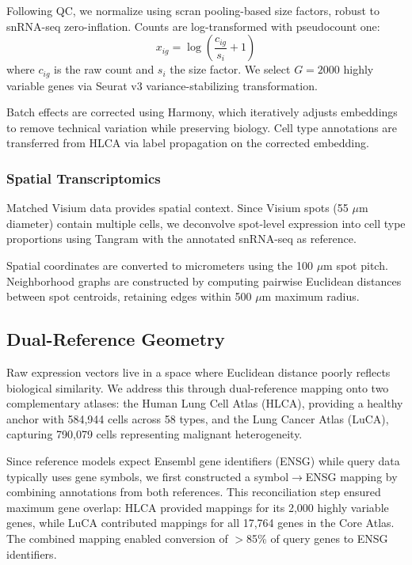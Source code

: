 Following QC, we normalize using scran pooling-based size factors, robust to snRNA-seq zero-inflation. Counts are log-transformed with pseudocount one:
\begin{equation}
    x_{ig} = \log\left(\frac{c_{ig}}{s_i} + 1\right)
\end{equation}
where $c_{ig}$ is the raw count and $s_i$ the size factor. We select $G = 2000$ highly variable genes via Seurat v3 variance-stabilizing transformation.

Batch effects are corrected using Harmony, which iteratively adjusts embeddings to remove technical variation while preserving biology. Cell type annotations are transferred from HLCA via label propagation on the corrected embedding.

\subsubsection{Spatial Transcriptomics}

Matched Visium data provides spatial context. Since Visium spots (55 $\mu$m diameter) contain multiple cells, we deconvolve spot-level expression into cell type proportions using Tangram with the annotated snRNA-seq as reference.

Spatial coordinates are converted to micrometers using the 100 $\mu$m spot pitch. Neighborhood graphs are constructed by computing pairwise Euclidean distances between spot centroids, retaining edges within 500 $\mu$m maximum radius.

\subsection{Dual-Reference Geometry}

Raw expression vectors live in a space where Euclidean distance poorly reflects biological similarity. We address this through dual-reference mapping onto two complementary atlases: the Human Lung Cell Atlas (HLCA), providing a healthy anchor with 584,944 cells across 58 types, and the Lung Cancer Atlas (LuCA), capturing 790,079 cells representing malignant heterogeneity.

Since reference models expect Ensembl gene identifiers (ENSG) while query data typically uses gene symbols, we first constructed a symbol$\to$ENSG mapping by combining annotations from both references. This reconciliation step ensured maximum gene overlap: HLCA provided mappings for its 2,000 highly variable genes, while LuCA contributed mappings for all 17,764 genes in the Core Atlas. The combined mapping enabled conversion of $>$85\% of query genes to ENSG identifiers.

